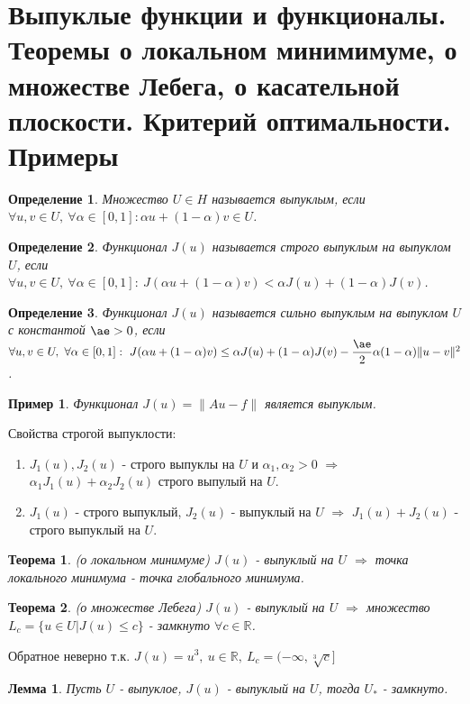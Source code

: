 \documentclass[9pt, a4paper]{extarticle}
\newtheorem*{theorem}{Теорема}
\newtheorem*{lemma}{Лемма}
\newtheorem*{definition}{Определение}
\newtheorem*{sample}{Пример}
\begin{document}
\section{Выпуклые функции и функционалы. Теоремы о локальном минимимуме, о множестве Лебега, о касательной плоскости. Критерий оптимальности. Примеры}
	\begin{definition}
		Множество $U \in H$ называется выпуклым, если $\forall u, v \in U, \ \forall \alpha \in [0,1]: \alpha u + (1-\alpha) v \in U$. 
	\end{definition}
	\begin{definition}
		Функционал $J(u)$ называется строго выпуклым на выпуклом $U$, если $\forall u, v \in U, \ \forall \alpha \in [0,1]: \ J(\alpha u + (1-\alpha)v) <  \alpha J(u) + (1-\alpha) J(v)$.
	\end{definition}
	\begin{definition}
		Функционал $J(u)$ называется сильно выпуклым на выпуклом $U$ с константой $\ae > 0$, если $\forall u, v \in U, \ \forall \alpha \in [0,1]: \ J(\alpha u + (1-\alpha)v) \leq  \alpha J(u) + (1-\alpha) J(v) - \dfrac\ae2 \alpha(1-\alpha) \|u-v\|^2$.
	\end{definition}
	\begin{sample}
		Функционал $J(u) = \|Au - f\|$ является выпуклым.
	\end{sample}
	Свойства строгой выпуклости:
	\begin{enumerate}
		\item $J_1(u), J_2(u)$ - строго выпуклы на $U$ и $\alpha_1, \alpha_2 >0$ $\Rightarrow$ $\alpha_1 J_1(u) + \alpha_2 J_2(u)$ строго выпулый на $U$. 
		\item $J_1(u)$ - строго выпуклый, $J_2(u)$ - выпуклый на $U$ $\Rightarrow$ $J_1(u) + J_2(u)$ - строго выпуклый на $U$. 
	\end{enumerate}
	\begin{theorem}
		(о локальном минимуме)\newline
		$J(u)$ - выпуклый на $U$ $\Rightarrow$ точка локального минимума - точка глобального минимума.
	\end{theorem}
	\begin{theorem}
		(о множестве Лебега)\newline
		$J(u)$ - выпуклый на $U$ $\Rightarrow$ множество $L_c = \{u \in U \vert J(u) \leq c\}$ - замкнуто $\forall c \in \mathbb{R}$. 
	\end{theorem}
	Обратное неверно т.к. $J(u) = u^3, \ u\in \mathbb{R}, \ L_c = (-\infty, \sqrt[3]{c}]$
	\begin{lemma}
		Пусть $U$ - выпуклое, $J(u)$ - выпуклый на $U$, тогда $U_*$ - замкнуто.
	\end{lemma}
\end{document}
